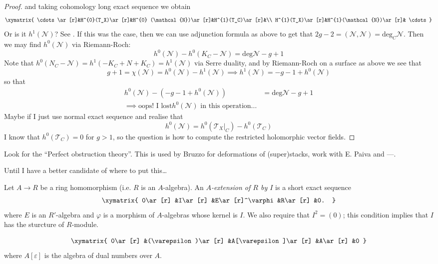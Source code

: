 \documentclass{book}
\begin{document}
\begin{proof}
and taking cohomology long exact sequence we
obtain
$$
\xymatrix{
\cdots\ar[r]&H^{0}(T_X)\ar[r]&H^{0}
(\mathcal{N})\ar[r]&H^{1}(T_C)\ar[r]&\\
H^{1}(T_X)\ar[r]&H^{1}(\mathcal{N})\ar[r]&
\cdots
}
$$
\medskip\noindent
Or is it $h^1(\mathcal{N})$? See
\cite{HarrMorr}. If this was the case, then
we
can use adjunction formula as above to get
that
$2g-2=(\mathcal{N},\mathcal{N})=\text{deg}_C
\mathcal{N}$. Then we may find
$h^0(\mathcal{N})$ via Riemann-Roch:
$$
h^0(\mathcal{N})-h^0(K_C-\mathcal{N})=
\text{deg}\mathcal{N}-g+1
$$
Note that
$h^0(N_C-\mathcal{N})=h^1(-K_C+N+K_C)=
h^1(\mathcal{N})$
via Serre
duality, and by Riemann-Roch on a surface as
above we see that
$$
g+1=\chi(\mathcal{N})=h^0(\mathcal{N})-
h^1(\mathcal{N})
\implies
h^1(\mathcal{N})=-g-1+h^0(\mathcal{N})
$$
so that
$$
\begin{aligned}
h^0(\mathcal{N})-(-g-1+h^0(\mathcal{N}))&=
\text{deg}\mathcal{N}-g+1\\
\implies \text{oops! I lost
$h^0(\mathcal{N})$ in this operation…}
\end{aligned}
$$
Maybe if I just use normal exact sequence and
realise that
$$
h^0(\mathcal{N})=h^0(\mathcal{T}_X|_{C})-
h^0(\mathcal{T}_C)
$$
I know that $h^0(\mathcal{T}_C)=0$ for $g>1$,
so the question is how to compute
the restricted holomorphic vector fields.
\end{proof}

\medskip\noindent
Look for the ``Perfect obstruction theory''.
This is used by Bruzzo for deformations of
(super)stacks,
work with E. Paiva and ---.

\medskip\noindent
Until I have a better candidate of where to
put this…

\begin{definition}
\label{definition-extension}
\begin{reference}
\cite[p.7]{Sernesi-deformations}
\end{reference}
Let $A \to R$ be a ring homomorphism
(i.e. $R$ is an $A$-algebra).
An {\it $A$-extension of $R$ by $I$} is a
short exact sequence
$$
\xymatrix{
0\ar[r]
&I\ar[r]
&E\ar[r]^\varphi
&R\ar[r]
&0.
}
$$
where $E$ is an $R'$-algebra
and $\varphi$ is a morphism of $A$-algebras
whose kernel is $I$.
We also require that $I^2=(0)$;
this condition implies that $I$ has the
sturcture of $R$-module.
\end{definition}

\begin{example}
\label{example-dual-numbers-extension}
$$
\xymatrix{
0\ar[r]
&(\varepsilon)\ar[r]
&A[\varepsilon]\ar[r]
&A\ar[r]
&0
}
$$
where $A[\varepsilon]$ is the algebra of dual
numbers over $A$.
\end{example}
\end{document}
